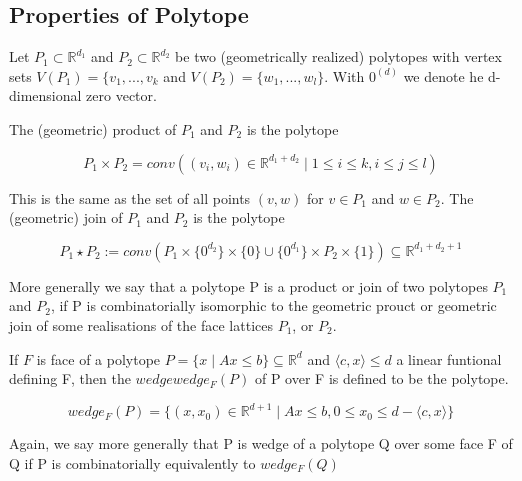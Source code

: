\subsection{Properties of Polytope}
Let $P_1 \subset \mathbb{R}^{d_1}$ and $P_2 \subset \mathbb{R}^{d_2}$ be two (geometrically realized) polytopes with vertex sets $V(P_1)=\{ v_1,...,v_k$ and $V(P_2)=\{ w_1,...,w_l \}$. With $0^{(d)}$ we denote he d-dimensional zero vector.

The (geometric) product of $P_1$ and $P_2$ is the polytope

\begin{equation}
P_1 \times P_2 = conv( (v_i,w_i)\in \mathbb{R}^{d_1+d_2}\mid 1\leq i \leq k, i \leq j \leq l)
\label{eqn:Einstein}
\end{equation}

This is the same as the set of all points $(v,w)$ for $v \in P_1$ and $w \in P_2$. The (geometric) join of $P_1$ and $P_2$ is the polytope

\begin{equation}
P_1 \star P_2 := conv(P_1 \times \{ 0^{d_2} \} \times \{ 0 \} \cup \{ 0^{d_1} \} \times P_2 \times \{ 1 \} ) \subseteq \mathbb{R}^{d_1+d_2+1}
\label{eqn:Einstein}
\end{equation}

More generally we say that a polytope P is a product or join of two polytopes $P_1$ and $P_2$, if P is combinatorially isomorphic to the geometric prouct or geometric join of some realisations of the face lattices $P_1$, or $P_2$.

If $F$ is face of a polytope  $P = \{ x \mid Ax \leq b \} \subseteq \mathbb{R}^d$  and $ \langle c,x \rangle \leq d $ a linear funtional defining F, then the $wedge wedge_F(P)$ of P over F is defined to be the polytope.
 
\begin{equation}
wedge_F(P) = \{ (x,x_0) \in \mathbb{R}^{d+1} \mid Ax\leq b, 0\leq x_0 \leq d- \langle c,x \rangle\}
\label{eqn:Einstein}
\end{equation}

Again, we say more generally that P is wedge of a polytope  Q over some face F of Q if P is combinatorially equivalently to $wedge_F(Q)$




